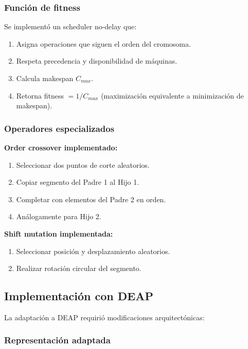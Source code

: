 \documentclass[12pt,a4paper]{article}
\begin{document}
\subsubsection{Función de fitness}

Se implementó un scheduler no-delay que:
\begin{enumerate}
    \item Asigna operaciones que siguen el orden del cromosoma.
    \item Respeta precedencia y disponibilidad de máquinas.
    \item Calcula makespan $C_{max}$.
    \item Retorna fitness $= 1/C_{max}$ (maximización equivalente a minimización de makespan).
\end{enumerate}

\subsubsection{Operadores especializados}

\textbf{Order crossover implementado:}
\begin{enumerate}
    \item Seleccionar dos puntos de corte aleatorios.
    \item Copiar segmento del Padre 1 al Hijo 1.
    \item Completar con elementos del Padre 2 en orden.
    \item Análogamente para Hijo 2.
\end{enumerate}

\textbf{Shift mutation implementada:}
\begin{enumerate}
    \item Seleccionar posición y desplazamiento aleatorios.
    \item Realizar rotación circular del segmento.
\end{enumerate}

\subsection{Implementación con DEAP}

La adaptación a DEAP requirió modificaciones arquitectónicas:

\subsubsection{Representación adaptada}
\end{document}
